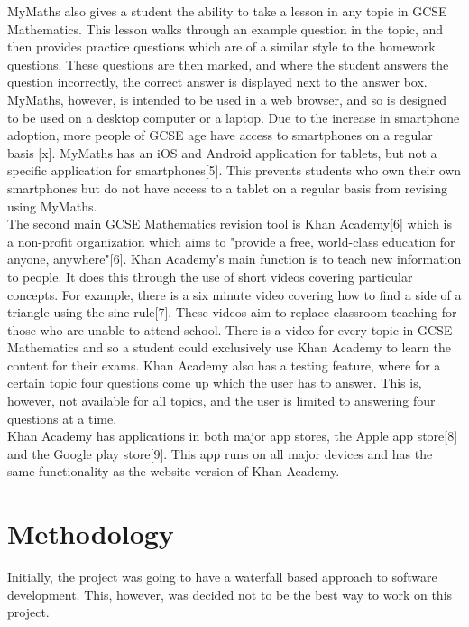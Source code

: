 \documentclass{article}
\begin{document}
MyMaths also gives a student the ability to take a lesson in any topic in GCSE Mathematics. This lesson walks through an example question in the topic, and then provides practice questions which are of a similar style to the homework questions. These questions are then marked, and where the student answers the question incorrectly, the correct answer is displayed next to the answer box. \\

MyMaths, however, is intended to be used in a web browser, and so is designed to be used on a desktop computer or a laptop. Due to the increase in smartphone adoption, more people of GCSE age have access to smartphones on a regular basis [x]. 
MyMaths has an iOS and Android application for tablets, but not a specific application for smartphones[5]. This prevents students who own their own smartphones but do not have access to a tablet on a regular basis from revising using MyMaths. \\

The second main GCSE Mathematics revision tool is Khan Academy[6] which is a non-profit organization which aims to "provide a free, world-class education for anyone, anywhere"[6]. Khan Academy's main function is to teach new information to people. It does this through the use of short videos covering particular concepts. For example, there is a six minute video covering how to find a side of a triangle using the sine rule[7]. These videos aim to replace classroom teaching for those who are unable to attend school. There is a video for every topic in GCSE Mathematics and so a student could exclusively use Khan Academy to learn the content for their exams. Khan Academy also has a testing feature, where for a certain topic four questions come up which the user has to answer. This is, however, not available for all topics, and the user is limited to answering four questions at a time. \\

Khan Academy has applications in both major app stores, the Apple app store[8] and the Google play store[9]. This app runs on all major devices and has the same functionality as the website version of Khan Academy. \\

\section{Methodology}

Initially, the project was going to have a waterfall based approach to software development. This, however, was decided not to be the best way to work on this project. 
\end{document}
